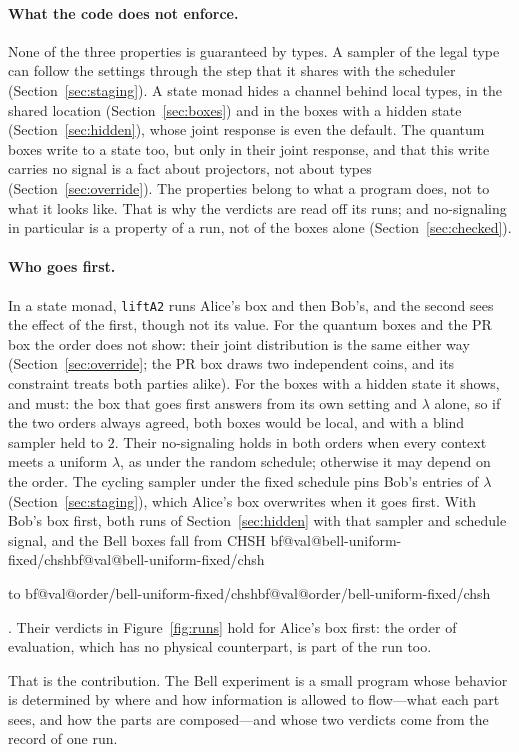 \documentclass[11pt]{article}
\makeatletter
\newcommand{\hs}{\lstinline[style=hask,basicstyle=\ttfamily,frame=none]}
\newcommand{\val}[1]{\ifcsname bf@val@#1\endcsname\csname bf@val@#1\endcsname
  \else\PackageError{paper}{No value #1 in generated/values.tex}{}\fi}
\makeatother
\begin{document}
\paragraph{What the code does not enforce.} None of the three properties is guaranteed by types. A sampler of the legal type can follow the settings through the step that it shares with the scheduler (Section~\ref{sec:staging}). A state monad hides a channel behind local types, in the shared location (Section~\ref{sec:boxes}) and in the boxes with a hidden state (Section~\ref{sec:hidden}), whose joint response is even the default. The quantum boxes write to a state too, but only in their joint response, and that this write carries no signal is a fact about projectors, not about types (Section~\ref{sec:override}). The properties belong to what a program does, not to what it looks like. That is why the verdicts are read off its runs; and no-signaling in particular is a property of a run, not of the boxes alone (Section~\ref{sec:checked}).

\paragraph{Who goes first.} In a state monad, \hs|liftA2| runs Alice's box and then Bob's, and the second sees the effect of the first, though not its value. For the quantum boxes and the PR box the order does not show: their joint distribution is the same either way (Section~\ref{sec:override}; the PR box draws two independent coins, and its constraint treats both parties alike). For the boxes with a hidden state it shows, and must: the box that goes first answers from its own setting and $\lambda$ alone, so if the two orders always agreed, both boxes would be local, and with a blind sampler held to $2$. Their no-signaling holds in both orders when every context meets a uniform $\lambda$, as under the random schedule; otherwise it may depend on the order. The cycling sampler under the fixed schedule pins Bob's entries of $\lambda$ (Section~\ref{sec:staging}), which Alice's box overwrites when it goes first. With Bob's box first, both runs of Section~\ref{sec:hidden} with that sampler and schedule signal, and the Bell boxes fall from CHSH \val{bell-uniform-fixed/chsh} to \val{order/bell-uniform-fixed/chsh}. Their verdicts in Figure~\ref{fig:runs} hold for Alice's box first: the order of evaluation, which has no physical counterpart, is part of the run too.

That is the contribution. The Bell experiment is a small program whose behavior is determined by where and how information is allowed to flow---what each part sees, and how the parts are composed---and whose two verdicts come from the record of one run.
\end{document}
